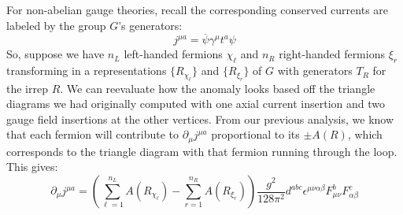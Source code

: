 \documentclass[11pt, oneside]{article}   	%
\theoremstyle{definition}
\numberwithin{equation}{subsection}		%
\begin{document}
For non-abelian gauge theories, recall the corresponding conserved currents are labeled by the group $G$'s generators:
\begin{equation}
	j^{\mu a} = \overline\psi \gamma^\mu t^a\psi
\end{equation}
So, suppose we have $n_L$ left-handed fermions $\chi_\ell$ and $n_R$ right-handed fermions $\xi_r$ transforming in a 
representations $\{R_{\chi_\ell}\}$ and $\{R_{\xi_r}\}$ of $G$ with generators $T_R$ for the irrep $R$. We can reevaluate how 
the anomaly looks based off the triangle diagrams we had originally computed with one axial current insertion and two gauge field 
insertions at the other vertices. From our previous analysis, we know that each fermion will contribute to $\partial_\mu j^{\mu a}$ 
proportional to its $\pm A(R)$, which corresponds to the triangle diagram with that fermion running through the loop. This gives:
\begin{equation}
	\partial_\mu j^{\mu a} = \left(\sum_{\ell = 1}^{n_L} A(R_{\chi_\ell}) - \sum_{r = 1}^{n_R} A(R_{\xi_r})\right)\frac{g^2}{128\pi^2} d^{abc} \epsilon^{\mu\nu\alpha\beta} 
	F_{\mu\nu}^b F_{\alpha\beta}^c
\end{equation}
\end{document}
